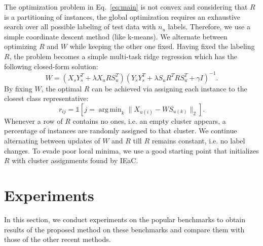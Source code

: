 \documentclass[10pt,twocolumn,letterpaper]{article}
\DeclareMathOperator*{\argmin}{arg\,min}
\begin{document}
The optimization problem in Eq.~\eqref{eq:main} is not convex and considering that $R$ is a partitioning of instances, the global optimization requires an
exhaustive search over all possible labeling of test data with $n_u$ labels. Therefore, we use a simple coordinate descent
method (like k-means). We alternate between optimizing $R$ and $W$ while keeping the other one fixed.
Having fixed the labeling $R$, the problem becomes a simple multi-task ridge regression which has the following closed-form solution:
\begin{equation} \label{eq:d_update}
  W = (X_s Y_s^T + \lambda X_u R S_u^T) (Y_s Y_s^T + \lambda S_u R^T R S_u^T  + \gamma I)^{-1}.
\end{equation}
By fixing $W$, the optimal $R$ can be achieved via assigning each instance to the closest class representative:
\begin{equation} \label{eq:r_update}
  r_{ij} = \mathds{1}[j = \argmin_{k} \lVert X_{u(i)} - W S_{u(k)} \rVert_2 ].
\end{equation}
Whenever a row of $R$ contains no ones, i.e. an empty cluster appears, a percentage of instances are randomly assigned to that cluster.
We continue alternating between updates of $W$ and $R$ till $R$ remains constant, i.e. no label changes.
To evade poor local minima, we use a good starting point that initializes $R$ with cluster assignments found by IEaC.
%
%
\section{Experiments} \label{experiments}
In this section, we conduct experiments on the popular benchmarks to obtain results of the proposed method on these benchmarks and compare them
 with those of the other recent methods.
\end{document}
